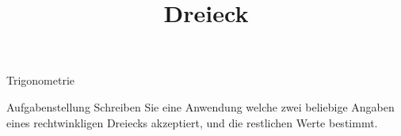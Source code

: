 \documentclass{article}
\title{Dreieck}
\begin{document}
	 \begin{section}{Trigonometrie}
	 	\begin{subsection}{Aufgabenstellung}
	 		Schreiben Sie eine Anwendung welche zwei beliebige Angaben eines rechtwinkligen Dreiecks akzeptiert, und die restlichen Werte bestimmt.\\
	 	\end{subsection}
	 \end{section}
\end{document}
